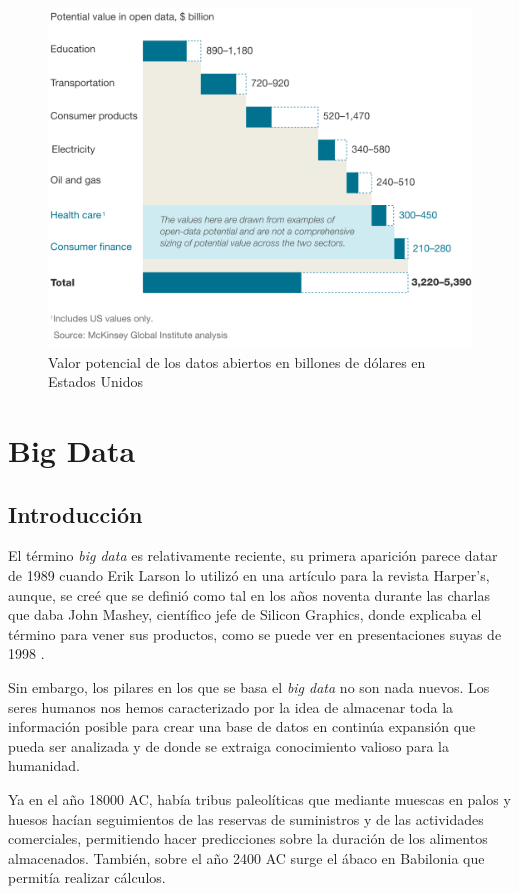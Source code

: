 \begin{figure}[htp!]
	\centering
	\caption{Valor potencial de los datos abiertos en billones de dólares en Estados Unidos}
	\label{fig:revenue}
	\vspace{5pt}
	\includegraphics[scale=0.8]{graphics/revenue}
\end{figure}


\newpage
\section{Big Data}
\subsection{Introducción}
El término \textit{big data} es relativamente reciente, su primera aparición parece datar de 1989 cuando Erik Larson lo utilizó en una artículo para la revista Harper's, aunque, se creé que se definió como tal en los años noventa durante las charlas que daba John Mashey, científico jefe de Silicon Graphics, donde explicaba el término para vener sus productos, como se puede ver en presentaciones suyas de 1998 \cite{originbd}.

Sin embargo, los pilares en los que se basa el \textit{big data} no son nada nuevos. Los seres humanos nos hemos caracterizado por la idea de almacenar toda la información posible para crear una base de datos en continúa expansión que pueda ser analizada y de donde se extraiga conocimiento valioso para la humanidad.

Ya en el año 18000 \gls{AC}, había tribus paleolíticas que mediante muescas en palos y huesos hacían seguimientos de las reservas de suministros y de las actividades comerciales, permitiendo hacer predicciones sobre la duración de los alimentos almacenados. También, sobre el año 2400 \gls{AC} surge el ábaco en Babilonia que permitía realizar cálculos.

